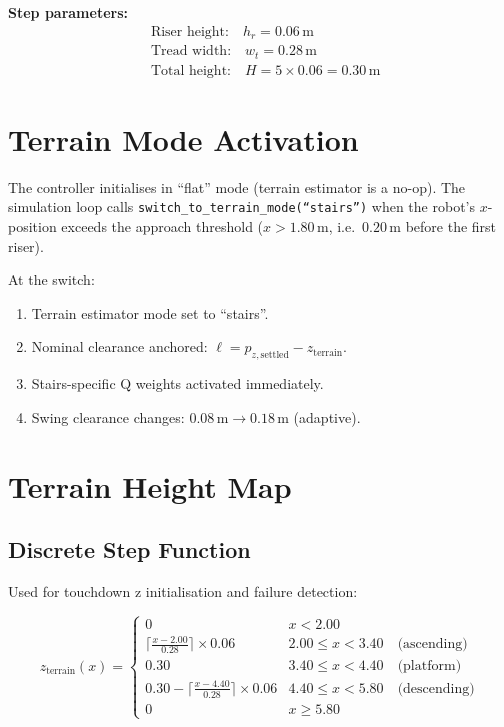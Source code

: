 \documentclass[12pt,a4paper]{report}
\begin{document}
\noindent\textbf{Step parameters:}
\begin{align*}
    &\text{Riser height:} \quad h_r = 0.06\,\text{m} \\
    &\text{Tread width:}  \quad w_t = 0.28\,\text{m} \\
    &\text{Total height:} \quad H = 5 \times 0.06 = 0.30\,\text{m}
\end{align*}

\section{Terrain Mode Activation}

The controller initialises in ``flat'' mode (terrain estimator is a no-op).
The simulation loop calls \texttt{switch\_to\_terrain\_mode(``stairs'')} when
the robot's $x$-position exceeds the approach threshold
($x > 1.80\,\text{m}$, i.e.\ $0.20\,\text{m}$ before the first riser).

At the switch:
\begin{enumerate}[noitemsep]
  \item Terrain estimator mode set to ``stairs''.
  \item Nominal clearance anchored: $\ell = p_{z,\text{settled}} - z_\text{terrain}$.
  \item Stairs-specific Q weights activated immediately.
  \item Swing clearance changes: $0.08\,\text{m} \to 0.18\,\text{m}$ (adaptive).
\end{enumerate}

\section{Terrain Height Map}

\subsection{Discrete Step Function}

Used for touchdown z initialisation and failure detection:

\begin{equation}
    z_\text{terrain}(x) =
    \begin{cases}
        0 & x < 2.00 \\
        \lceil\frac{x - 2.00}{0.28}\rceil \times 0.06 & 2.00 \leq x < 3.40
                \quad\text{(ascending)} \\
        0.30 & 3.40 \leq x < 4.40 \quad\text{(platform)} \\
        0.30 - \lceil\frac{x - 4.40}{0.28}\rceil \times 0.06 & 4.40 \leq x < 5.80
                \quad\text{(descending)} \\
        0 & x \geq 5.80
    \end{cases}
\end{equation}
\end{document}
